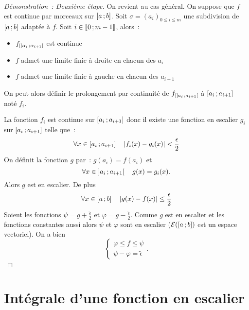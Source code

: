 \begin{proof}[Démonstration~: Deuxième étape]
  On revient au cas général. On suppose que $f$ est continue par morceaux sur $\left[ a \, ;  b \right]$. Soit $\sigma=(a_i)_{0 \leq i \leq m}$ une subdivision de $\left[ a \, ;  b \right]$ adaptée à $f$. Soit $i \in \mathopen{\llbracket}0\mathclose{}\mathpunct{};m-1\mathclose{\rrbracket}$, alors~:
  \begin{itemize}
  \item $f_{|\left] \alpha_i \, ;  \alpha_{i+1} \right[}$ est continue
  \item $f$ admet une limite finie à droite en chacun des $a_i$
  \item $f$ admet une limite finie à gauche en chacun des $a_{i+1}$
  \end{itemize}
  On peut alors définir le prolongement par continuité de $f_{|\left] a_i \, ;  a_{i+1} \right[}$ à $\left[ a_i \, ;  a_{i+1} \right]$ noté $f_i$.

  La fonction $f_i$ est continue sur $\left[ a_i \, ;  a_{i+1} \right]$ donc il existe une fonction en escalier $g_i$ sur $\left[ a_i \, ;  a_{i+1} \right]$ telle que~:
  \begin{equation}
    \forall x \in \left[ a_i \, ;  a_{i+1} \right] \quad \left\lvert f_i(x)-g_i(x)\right\rvert < \frac{\epsilon}{2}
  \end{equation}
  On définit la fonction $g$ par~: $g(a_i)=f(a_i)$ et
  \begin{equation}
    \forall x \in \left] a_i \, ;  a_{i+1} \right[ \quad g(x)=g_i(x).
  \end{equation}
  Alors $g$ est en escalier. De plus
  \begin{equation}
    \forall x \in \left[ a \, ;  b \right] \quad \left\lvert g(x)-f(x)\right\rvert \leq \frac{\epsilon}{2}
  \end{equation}
  Soient les fonctions $\psi=g + \frac{\tilde{\epsilon}}{2}$ et $\varphi=g - \frac{\tilde{\epsilon}}{2}$. Comme $g$ est en escalier et les fonctions constantes aussi alors $\psi$ et $\varphi$ sont en escalier ($\mathcal{E}(\left[ a \, ;  b \right])$ est un espace vectoriel). On a bien
  \begin{equation}
    \begin{cases}
      \varphi \leq f \leq \psi \\
      \psi-\varphi=\tilde{\epsilon}
    \end{cases}.
  \end{equation}
\end{proof}

\section{Intégrale d'une fonction en escalier}


